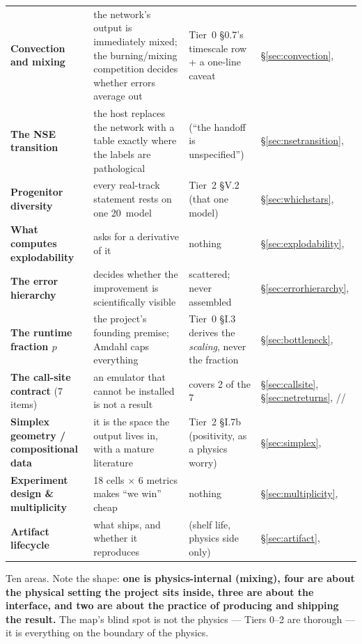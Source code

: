 \begin{longtable}{@{}L{2.9cm} L{4.6cm} L{4.0cm} L{2.6cm}@{}}
\textbf{Convection and mixing} &
  the network's output is immediately mixed; the burning/mixing competition
  decides whether \Ye{} errors average out &
  Tier~0 \S 0.7's timescale row + a one-line caveat &
  \S\ref{sec:convection},  \\
\textbf{The NSE transition} &
  the host replaces the network with a table exactly where the labels are
  pathological &
   (``the handoff is unspecified'') &
  \S\ref{sec:nsetransition},  \\
\textbf{Progenitor diversity} &
  every real-track statement rests on one 20\,\Msun{} model &
  Tier~2 \S V.2 (that one model) &
  \S\ref{sec:whichstars},  \\
\textbf{What computes explodability} &
   asks for a derivative of it &
  nothing &
  \S\ref{sec:explodability},  \\
\textbf{The error hierarchy} &
  decides whether the improvement is scientifically visible &
  scattered; never assembled &
  \S\ref{sec:errorhierarchy},  \\
\textbf{The runtime fraction $p$} &
  the project's founding premise; Amdahl caps everything &
  Tier~0 \S I.3 derives the \emph{scaling}, never the fraction &
  \S\ref{sec:bottleneck},  \\
\textbf{The call-site contract} (7 items) &
  an emulator that cannot be installed is not a result &
   covers 2 of the 7 &
  \S\ref{sec:callsite}, \S\ref{sec:netreturns}, // \\
\textbf{Simplex geometry / compositional data} &
  it is the space the output lives in, with a mature literature &
  Tier~2 \S I.7b (positivity, as a physics worry) &
  \S\ref{sec:simplex},  \\
\textbf{Experiment design \& multiplicity} &
  18 cells $\times$ 6 metrics makes ``we win'' cheap &
  nothing &
  \S\ref{sec:multiplicity},  \\
\textbf{Artifact lifecycle} &
  what ships, and whether it reproduces &
   (shelf life, physics side only) &
  \S\ref{sec:artifact},  \\
\end{longtable}
\endgroup

Ten areas. Note the shape: \textbf{one is physics-internal (mixing), four are
about the physical setting the project sits inside, three are about the
interface, and two are about the practice of producing and shipping the result.}
The map's blind spot is not the physics --- Tiers 0--2 are thorough --- it is
everything on the boundary of the physics.

